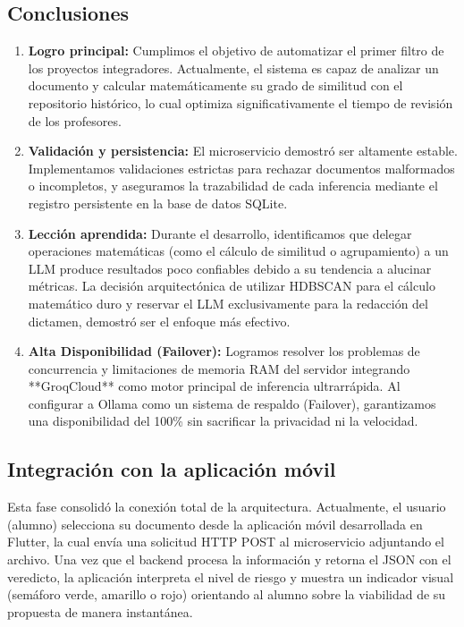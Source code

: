 

\subsection{Conclusiones}

\begin{enumerate}
  \item \textbf{Logro principal:} Cumplimos el objetivo de automatizar el primer filtro de los proyectos integradores. Actualmente, el sistema es capaz de analizar un documento y calcular matemáticamente su grado de similitud con el repositorio histórico, lo cual optimiza significativamente el tiempo de revisión de los profesores.
  \item \textbf{Validación y persistencia:} El microservicio demostró ser altamente estable. Implementamos validaciones estrictas para rechazar documentos malformados o incompletos, y aseguramos la trazabilidad de cada inferencia mediante el registro persistente en la base de datos SQLite.
  \item \textbf{Lección aprendida:} Durante el desarrollo, identificamos que delegar operaciones matemáticas (como el cálculo de similitud o agrupamiento) a un LLM produce resultados poco confiables debido a su tendencia a alucinar métricas. La decisión arquitectónica de utilizar HDBSCAN para el cálculo matemático duro y reservar el LLM exclusivamente para la redacción del dictamen, demostró ser el enfoque más efectivo.
  \item \textbf{Alta Disponibilidad (Failover):} Logramos resolver los problemas de concurrencia y limitaciones de memoria RAM del servidor integrando **GroqCloud** como motor principal de inferencia ultrarrápida. Al configurar a Ollama como un sistema de respaldo (Failover), garantizamos una disponibilidad del 100\% sin sacrificar la privacidad ni la velocidad.
\end{enumerate}

\subsection{Integración con la aplicación móvil}

Esta fase consolidó la conexión total de la arquitectura. Actualmente, el usuario (alumno) selecciona su documento desde la aplicación móvil desarrollada en Flutter, la cual envía una solicitud HTTP POST al microservicio adjuntando el archivo. Una vez que el backend procesa la información y retorna el JSON con el veredicto, la aplicación interpreta el nivel de riesgo y muestra un indicador visual (semáforo verde, amarillo o rojo) orientando al alumno sobre la viabilidad de su propuesta de manera instantánea.

